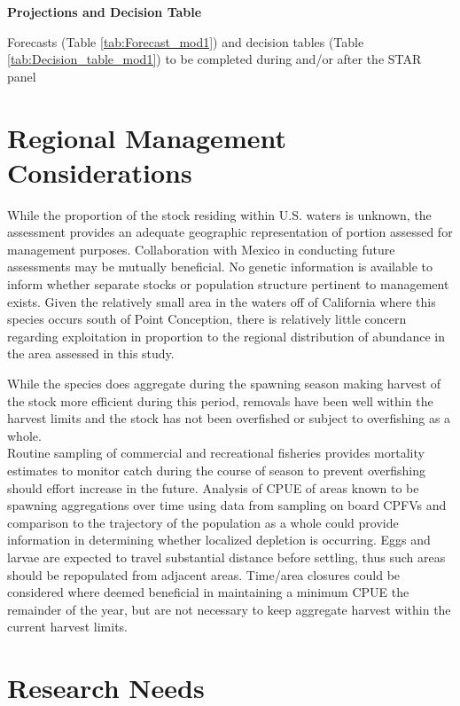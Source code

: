 \documentclass[12pt,]{article}
\begin{document}
\textbf{Projections and Decision Table}

Forecasts (Table \ref{tab:Forecast_mod1}) and decision tables (Table
\ref{tab:Decision_table_mod1}) to be completed during and/or after the
STAR panel

\section{Regional Management
Considerations}\label{regional-management-considerations}

While the proportion of the stock residing within U.S. waters is
unknown, the assessment provides an adequate geographic representation
of portion assessed for management purposes. Collaboration with Mexico
in conducting future assessments may be mutually beneficial. No genetic
information is available to inform whether separate stocks or population
structure pertinent to management exists. Given the relatively small
area in the waters off of California where this species occurs south of
Point Conception, there is relatively little concern regarding
exploitation in proportion to the regional distribution of abundance in
the area assessed in this study.

While the species does aggregate during the spawning season making
harvest of the stock more efficient during this period, removals have
been well within the harvest limits and the stock has not been
overfished or subject to overfishing as a whole.\\
Routine sampling of commercial and recreational fisheries provides
mortality estimates to monitor catch during the course of season to
prevent overfishing should effort increase in the future. Analysis of
CPUE of areas known to be spawning aggregations over time using data
from sampling on board CPFVs and comparison to the trajectory of the
population as a whole could provide information in determining whether
localized depletion is occurring. Eggs and larvae are expected to travel
substantial distance before settling, thus such areas should be
repopulated from adjacent areas. Time/area closures could be considered
where deemed beneficial in maintaining a minimum CPUE the remainder of
the year, but are not necessary to keep aggregate harvest within the
current harvest limits.

\section{Research Needs}\label{research-needs}
\end{document}
